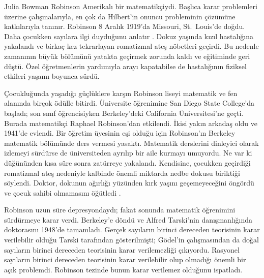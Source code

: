 \documentclass[../../../include/open-logic-section]{subfiles}
\begin{document}



Julia Bowman Robinson Amerikalı bir matematikçiydi. Başlıca karar problemleri
üzerine çalışmalarıyla, en çok da Hilbert'in onuncu probleminin çözümüne
katkılarıyla tanınır. Robinson 8 Aralık 1919'da Missouri, St.~Louis'de doğdu.
Daha çocukken sayılara ilgi duyduğunu anlatır \citep[4]{Reid1986}. Dokuz
yaşında kızıl hastalığına yakalandı ve birkaç kez tekrarlayan romatizmal ateş
nöbetleri geçirdi. Bu nedenle zamanının büyük bölümünü yatakta geçirmek
zorunda kaldı ve eğitiminde geri düştü. Özel öğretmenlerin yardımıyla arayı
kapatabilse de hastalığının fiziksel etkileri yaşamı boyunca sürdü.

Çocukluğunda yaşadığı güçlüklere karşın Robinson liseyi matematik ve fen
alanında birçok ödülle bitirdi. Üniversite öğrenimine San Diego State
College'da başladı; son sınıf öğrencisiyken Berkeley'deki California
Üniversitesi'ne geçti. Burada matematikçi Raphael Robinson'dan etkilendi.
İkisi yakın arkadaş oldu ve 1941'de evlendi. Bir öğretim üyesinin eşi olduğu
için Robinson'ın Berkeley matematik bölümünde ders vermesi yasaktı. Matematik
derslerini dinleyici olarak izlemeyi sürdürse de üniversiteden ayrılıp bir
aile kurmayı umuyordu. Ne var ki düğününden kısa süre sonra zatürreye
yakalandı. Kendisine, çocukken geçirdiği romatizmal ateş nedeniyle kalbinde
önemli miktarda nedbe dokusu biriktiği söylendi. Doktor, dokunun ağırlığı
yüzünden kırk yaşını geçemeyeceğini öngördü ve çocuk sahibi olmamasını
öğütledi \citep[13]{Reid1986}.

Robinson uzun süre depresyondaydı; fakat sonunda matematik öğrenimini
sürdürmeye karar verdi. Berkeley'e döndü ve Alfred Tarski'nin danışmanlığında
doktorasını 1948'de tamamladı. Gerçek sayıların birinci dereceden teorisinin
karar verilebilir olduğu Tarski tarafından gösterilmişti; G\"odel'in
çalışmasından da doğal sayıların birinci dereceden teorisinin karar
verilemezliği çıkıyordu. Rasyonel sayıların birinci dereceden teorisinin
karar verilebilir olup olmadığı önemli bir açık problemdi. Robinson tezinde
\citeyearpar{Robinson1949} bunun karar verilemez olduğunu ispatladı.
\end{document}
